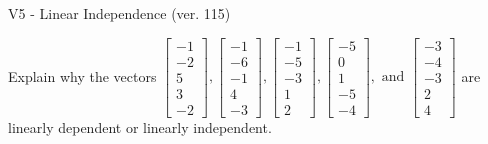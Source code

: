 \begin{exercise}
  \begin{exerciseTitle}V5 - Linear Independence (ver. 115)\end{exerciseTitle}
  \begin{exerciseStatement}
    Explain why the vectors \(\left[\begin{array}{r}
-1 \\
-2 \\
5 \\
3 \\
-2
\end{array}\right] , \left[\begin{array}{r}
-1 \\
-6 \\
-1 \\
4 \\
-3
\end{array}\right] , \left[\begin{array}{r}
-1 \\
-5 \\
-3 \\
1 \\
2
\end{array}\right] , \left[\begin{array}{r}
-5 \\
0 \\
1 \\
-5 \\
-4
\end{array}\right] , \text{ and } \left[\begin{array}{r}
-3 \\
-4 \\
-3 \\
2 \\
4
\end{array}\right]\) are linearly dependent or linearly independent.	



\end{exerciseStatement}
\end{exercise}
